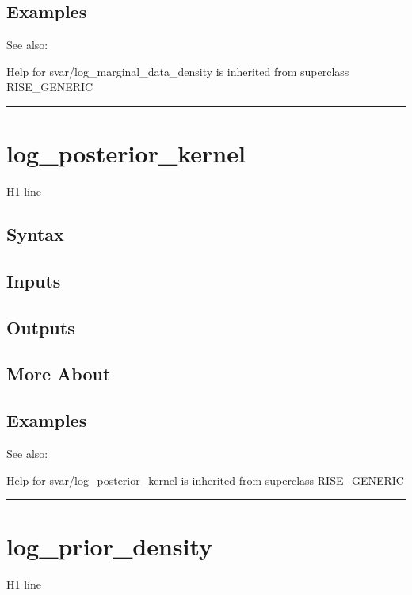 \documentclass[letterpaper,10pt,english]{sphinxmanual}
\begin{document}
\subsection{Examples}
\label{classes/models/@svar/svar:id54}
See also:

Help for svar/log\_marginal\_data\_density is inherited from superclass RISE\_GENERIC


\bigskip\hrule{}\bigskip



\section{log\_posterior\_kernel}
\label{classes/models/@svar/svar:log-posterior-kernel}\label{classes/models/@svar/svar:id55}
H1 line


\subsection{Syntax}
\label{classes/models/@svar/svar:id56}

\subsection{Inputs}
\label{classes/models/@svar/svar:id57}

\subsection{Outputs}
\label{classes/models/@svar/svar:id58}

\subsection{More About}
\label{classes/models/@svar/svar:id59}

\subsection{Examples}
\label{classes/models/@svar/svar:id60}
See also:

Help for svar/log\_posterior\_kernel is inherited from superclass RISE\_GENERIC


\bigskip\hrule{}\bigskip



\section{log\_prior\_density}
\label{classes/models/@svar/svar:id61}\label{classes/models/@svar/svar:log-prior-density}
H1 line
\end{document}
